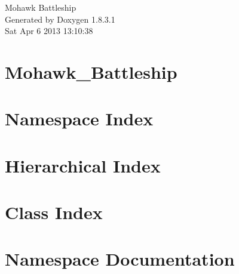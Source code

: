 \documentclass{book}
\begin{document}
\hypersetup{pageanchor=false,citecolor=blue}
\begin{titlepage}
\vspace*{7cm}
\begin{center}
{\Large Mohawk Battleship }\\
\vspace*{1cm}
{\large Generated by Doxygen 1.8.3.1}\\
\vspace*{0.5cm}
{\small Sat Apr 6 2013 13:10:38}\\
\end{center}
\end{titlepage}
\clearemptydoublepage
{}
\tableofcontents
\clearemptydoublepage
{}
\hypersetup{pageanchor=true,citecolor=blue}
\chapter{Mohawk\-\_\-\-Battleship}
\label{md_README}
\hypertarget{md_README}{}

\chapter{Namespace Index}

\chapter{Hierarchical Index}

\chapter{Class Index}

\chapter{Namespace Documentation}











\end{document}

